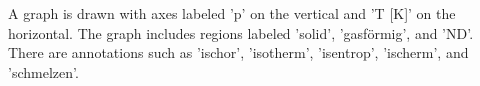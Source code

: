 A graph is drawn with axes labeled 'p' on the vertical and 'T [K]' on the horizontal. The graph includes regions labeled 'solid', 'gasförmig', and 'ND'. There are annotations such as 'ischor', 'isotherm', 'isentrop', 'ischerm', and 'schmelzen'.